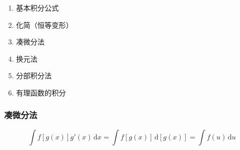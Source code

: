 \documentclass[../book.tex]{subfiles}
\begin{document}
    \begin{enumerate}
        \item 基本积分公式
        \item 化简（恒等变形）
        \item 凑微分法
        \item 换元法
        \item 分部积分法
        \item 有理函数的积分
    \end{enumerate}

    \subsubsection{凑微分法}

    \[
        \int f[g(x)]g'(x)\,\mathrm{d}x = \int f[g(x)]\,\mathrm{d}[g(x)] = \int f(u)\,\mathrm{d}u
    \]
\end{document}
